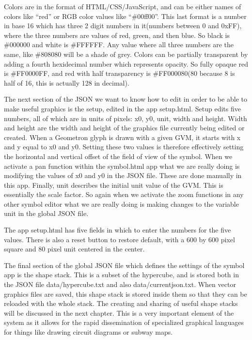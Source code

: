 Colors are in the format of HTML/CSS/JavaScript, and can be either names of colors like ``red'' or RGB color values like ``\#00ff00''.  This last format is a number in base 16 which has three 2 digit numbers in it(numbers between 0 and 0xFF), where the three numbers are values of red, green, and then blue.  So black is \#000000 and white is \#FFFFFF.  Any value where all three numbers are the same, like \#808080 will be a shade of grey.   Colors can be partially transparent by adding a fourth hexidecimal number which represents opacity.  So fully opaque red is \#FF0000FF, and red with half transparency is #FF000080(80 because 8 is half of 16, this is actually 128 in decimal).

The next section of the JSON we want to know how to edit in order to be able to make useful graphics is the setup, edited in the app setup.html.  Setup edits five numbers, all of which are in units of pixels: x0, y0, unit, width and height.  Width and height are the width and height of the graphics file currently being edited or created.  When a Geometron glyph is drawn with a given GVM, it starts with x and y equal to x0 and y0. Setting these two values is therefore effectively setting the horizontal and vertical offset of the field of view of the symbol.  When we activate a pan function within the symbol.html app what we are really doing is modifying the values of x0 and y0 in the JSON file.  These are done manually in this app.  Finally, unit describes the initial unit value of the GVM.  This is essentially the scale factor.  So again when we activate the zoom functions in any other symbol editor what we are really doing is making changes to the variable unit in the global JSON file.    

The app setup.html has five fields in which to enter the numbers for the five values. There is also a reset button to restore default, with a 600 by 600 pixel square and 80 pixel unit centered in the center.  

The final section of the global JSON file which defines the settings of the symbol app is the shape stack.  This is a subset of the hypercube, and is stored both in the JSON file data/hypercube.txt and also data/currentjson.txt.  When vector graphics files are saved, this shape stack is stored inside them so that they can be reloaded with the whole stack.  The creating and sharing of useful shape stacks will be discussed in the next chapter.  This is a very important element of the system as it allows for the rapid dissemination of specialized graphical languages for things like drawing circuit diagrams or subway maps.

